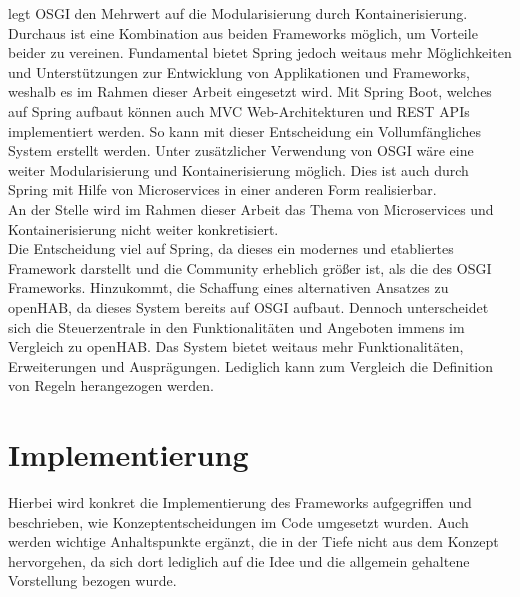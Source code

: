     legt \acs{OSGI} den Mehrwert auf die Modularisierung durch Kontainerisierung. Durchaus ist eine Kombination aus beiden 
    Frameworks möglich, um Vorteile beider zu vereinen. Fundamental bietet Spring jedoch weitaus mehr Möglichkeiten und Unterstützungen 
    zur Entwicklung von Applikationen und Frameworks, weshalb es im Rahmen dieser Arbeit eingesetzt wird. Mit Spring Boot, welches auf Spring 
    aufbaut können auch \acl{MVC} Web-Architekturen und \acs{REST} \acs{API}s implementiert werden. So kann mit dieser Entscheidung 
    ein Vollumfängliches System erstellt werden. Unter zusätzlicher Verwendung von \acs{OSGI} wäre eine weiter Modularisierung und Kontainerisierung möglich. Dies 
    ist auch durch Spring mit Hilfe von Microservices in einer anderen Form realisierbar. 
    \\
    An der Stelle wird im Rahmen dieser Arbeit das Thema von Microservices und Kontainerisierung nicht weiter konkretisiert.
    \\
    \linebreak
    Die Entscheidung viel auf Spring, da dieses ein modernes und etabliertes Framework darstellt und die 
    Community erheblich größer ist, als die des \acs{OSGI} Frameworks. Hinzukommt, die Schaffung eines alternativen Ansatzes zu openHAB, da dieses System bereits 
    auf \acs{OSGI} aufbaut. 
    Dennoch unterscheidet sich die Steuerzentrale in den Funktionalitäten und Angeboten immens im Vergleich zu openHAB. Das System bietet weitaus mehr 
    Funktionalitäten, Erweiterungen und Ausprägungen. Lediglich kann zum Vergleich die Definition von Regeln herangezogen werden. 

\section{Implementierung}
\label{sec:implementation}
    Hierbei wird konkret die Implementierung des Frameworks aufgegriffen und beschrieben, wie Konzeptentscheidungen im Code umgesetzt wurden. 
    Auch werden wichtige Anhaltspunkte ergänzt, die in der Tiefe nicht aus dem Konzept hervorgehen, da sich dort lediglich auf die Idee und die allgemein gehaltene 
    Vorstellung bezogen wurde. 

